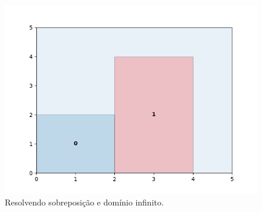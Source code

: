 \begin{figure}[!htb]
    \centering
    \includegraphics[scale=0.5]{utils/images/continuous_example}
    \caption{Resolvendo sobreposição e domínio infinito.}
    \label{fig:sobreposicao-dominio}
\end{figure}
